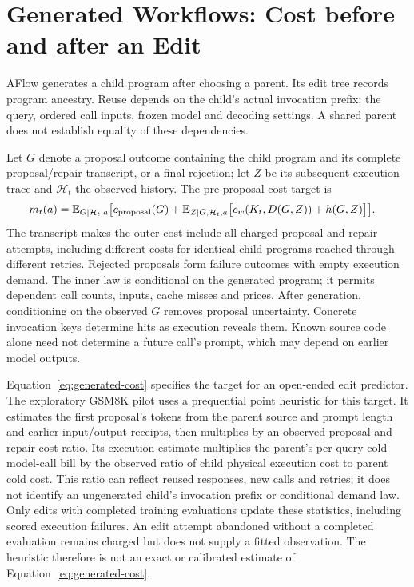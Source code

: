 \section{Generated Workflows: Cost before and after an Edit}
\label{sec:dynamic-completion}
AFlow generates a child program after choosing a parent. Its edit tree records
program ancestry. Reuse depends on the child's actual invocation prefix: the
query, ordered call inputs, frozen model and decoding settings. A shared parent
does not establish equality of these dependencies.

Let $G$ denote a proposal outcome containing the child program and its complete
proposal/repair transcript, or a final rejection; let $Z$ be its subsequent
execution trace and $\mathcal H_t$ the observed history. The pre-proposal cost target is
\begin{equation}
\begin{split}
 m_t(a)=\mathbb E_{G\mid\mathcal H_t,a}\bigl[&c_{\rm proposal}(G)
 +\mathbb E_{Z\mid G,\mathcal H_t,a}\bigl[
 c_w(K_t,D(G,Z))+h(G,Z)\bigr]\bigr].
\end{split}
\label{eq:generated-cost}
\end{equation}
The transcript makes the outer cost include all charged proposal and repair attempts,
including different costs for identical child programs reached through different retries. Rejected
proposals form failure outcomes with empty execution demand. The inner law is
conditional on the generated program; it permits dependent call counts,
inputs, cache misses and prices. After generation, conditioning on the
observed $G$ removes proposal uncertainty. Concrete invocation keys determine
hits as execution reveals them. Known source code alone need not determine a
future call's prompt, which may depend on earlier model outputs.

Equation~\eqref{eq:generated-cost} specifies the target for an open-ended edit
predictor. The exploratory GSM8K pilot uses a prequential point heuristic for
this target. It estimates the first proposal's tokens from the parent source
and prompt length and earlier input/output receipts, then multiplies by an
observed proposal-and-repair cost ratio. Its execution estimate multiplies the
parent's per-query cold model-call bill by the observed ratio of child physical
execution cost to parent cold cost. This ratio can reflect reused responses,
new calls and retries; it does not identify an ungenerated child's invocation
prefix or conditional demand law. Only edits with completed training
evaluations update these statistics, including scored execution failures.
An edit attempt abandoned without a completed evaluation remains charged but
does not supply a fitted observation. The heuristic therefore is not an exact
or calibrated estimate of Equation~\eqref{eq:generated-cost}.

